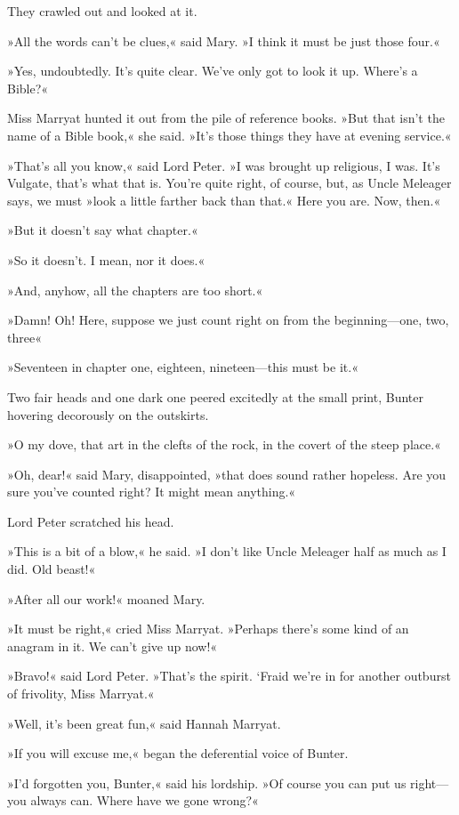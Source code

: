They crawled out and looked at it.

»All the words can't be clues,« said Mary. »I think it must be just those four.«

»Yes, undoubtedly. It's quite clear. We've only got to look it up. Where's a Bible?«

Miss Marryat hunted it out from the pile of reference books. »But that isn't the name of a Bible book,« she said. »It's those things they have at evening service.«

»That's all you know,« said Lord Peter. »I was brought up religious, I was. It's Vulgate, that's what that is. You're quite right, of course, but, as Uncle Meleager says, we must »look a little farther back than that.« Here you are. Now, then.«

»But it doesn't say what chapter.«

»So it doesn't. I mean, nor it does.«

»And, anyhow, all the chapters are too short.«

»Damn! Oh! Here, suppose we just count right on from the beginning—one, two, three\longdash«

»Seventeen in chapter one, eighteen, nineteen—this must be it.«

Two fair heads and one dark one peered excitedly at the small print, Bunter hovering decorously on the outskirts.

»O my dove, that art in the clefts of the rock, in the covert of the steep place.«

»Oh, dear!« said Mary, disappointed, »that does sound rather hopeless. Are you sure you've counted right? It might mean anything.«

Lord Peter scratched his head.

»This is a bit of a blow,« he said. »I don't like Uncle Meleager half as much as I did. Old beast!«

»After all our work!« moaned Mary.

»It must be right,« cried Miss Marryat. »Perhaps there's some kind of an anagram in it. We can't give up now!«

»Bravo!« said Lord Peter. »That's the spirit. `Fraid we're in for another outburst of frivolity, Miss Marryat.«

»Well, it's been great fun,« said Hannah Marryat.

»If you will excuse me,« began the deferential voice of Bunter.

»I'd forgotten you, Bunter,« said his lordship. »Of course you can put us right—you always can. Where have we gone wrong?«

